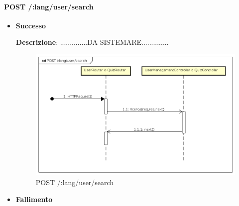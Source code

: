 \paragraph{POST /:lang/user/search}
\begin{itemize}
\item \textbf{Successo}

\textbf{Descrizione}: ..............DA SISTEMARE..............

\begin{figure}[ht]
	\centering
	\includegraphics[scale=0.45]{UML/DiagrammiDiSequenza/Back-end/POST__lang_user_search.png}
	\caption{POST /:lang/user/search}
\end{figure}
\FloatBarrier

\item \textbf{Fallimento}
\end{itemize}

